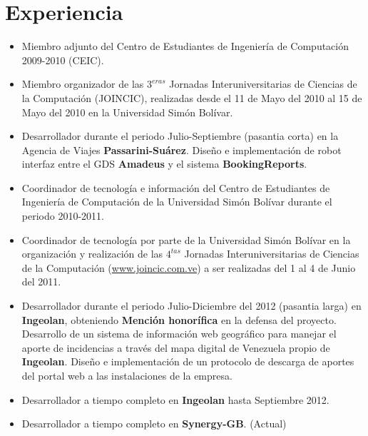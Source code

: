 \documentclass[10pt,a4paper]{moderncv}
\begin{document}
\section{Experiencia}
	\begin{itemize}
	   \item Miembro adjunto del Centro de Estudiantes de Ingenier\'ia de 
             Computaci\'on 2009-2010 (CEIC).
	   \item Miembro organizador de las $3^{eras}$ Jornadas Interuniversitarias 
             de Ciencias de la Computaci\'on (JOINCIC), realizadas desde el 11 
             de Mayo del 2010 al 15 de Mayo del 2010 en la Universidad Sim\'on 
             Bol\'ivar. 
       \item Desarrollador durante el periodo Julio-Septiembre (pasantia 
             corta) en la Agencia de Viajes \textbf{Passarini-Su\'arez}. 
             Dise\~no e implementaci\'on de robot interfaz entre el GDS 
             \textbf{Amadeus} y el sistema \textbf{BookingReports}.
       \item Coordinador de tecnolog\'ia e informaci\'on del Centro de 
             Estudiantes de Ingenier\'ia de Computaci\'on de la Universidad 
             Sim\'on Bol\'ivar durante el periodo 2010-2011.
       \item Coordinador de tecnolog\'ia por parte de la Universidad Sim\'on 
             Bol\'ivar en la organizaci\'on y realizaci\'on de las $4^{tas}$ 
             Jornadas Interuniversitarias de Ciencias de la Computaci\'on 
             (\url{www.joincic.com.ve}) a ser realizadas del 1 al 4 de Junio 
             del 2011.
       \item Desarrollador durante el periodo Julio-Diciembre del 2012 
            (pasantia larga) en \textbf{Ingeolan}, obteniendo 
            \textbf{Menci\'on honor\'ifica} en la defensa del proyecto. 
            Desarrollo de un sistema de informaci\'on web geogr\'afico para 
            manejar el aporte de incidencias a trav\'es del mapa digital de 
            Venezuela propio de \textbf{Ingeolan}. Dise\~no e implementaci\'on 
            de un protocolo de descarga de aportes del portal web a las 
            instalaciones de la empresa.
       \item Desarrollador a tiempo completo en \textbf{Ingeolan} hasta Septiembre 2012.
       \item Desarrollador a tiempo completo en \textbf{Synergy-GB}. (Actual)
    \end{itemize}

\newpage
\end{document}
